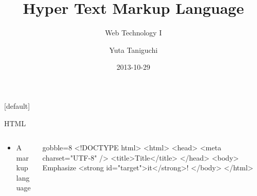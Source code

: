 \documentclass[11pt]{beamer}
\title{Hyper Text Markup Language}
\subtitle{Web Technology I}
\author{Yuta Taniguchi}
\institute{@yuttieyuttie}
\date{2013-10-29}
\begin{document}
{%
  [default]
  \frame{\titlepage}
}
\setcounter{framenumber}{0}


\begin{frame}[fragile]{HTML}
  \begin{columns}
    \begin{column}{0.4\textwidth}
      \begin{itemize}
        \item A markup language
      \end{itemize}
    \end{column}
    \begin{column}{0.6\textwidth}
      \begin{html*}{gobble=8}
        <!DOCTYPE html>
        <html>
          <head>
            <meta charset="UTF-8" />
            <title>Title</title>
          </head>
          <body>
            Emphasize
            <strong id="target">it</strong>!
          </body>
        </html>
      \end{html*}
    \end{column}
  \end{columns}
\end{frame}
\end{document}
